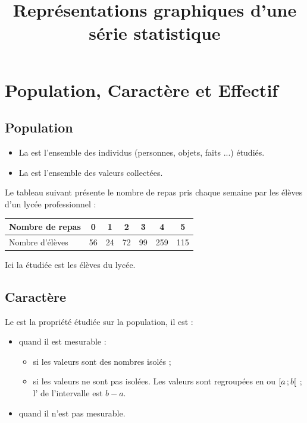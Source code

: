 \documentclass[12pt,a4paper]{article}
\date{}
\title{Représentations graphiques d'une série statistique }
\begin{document}
\maketitle

\section{Population, Caractère et Effectif}

\subsection{Population}
\begin{mydefs}
	\begin{itemize}
		\item La  est l'ensemble des individus (personnes, objets, faits ...) étudiés.
		\item La  est l'ensemble des valeurs collectées.
	\end{itemize}
\end{mydefs}


\begin{myex}
	
	Le tableau suivant présente le nombre de repas pris chaque semaine par les élèves d'un lycée professionnel :
	
	\begin{center}
		\begin{tabular}{|@{\ }l@{\ }|@{\ }c@{\ }|@{\ }c@{\ }|@{\ }c@{\ }|@{\ }c@{\ }|@{\ }c@{\ }|@{\ }c@{\ }|}
			\hline
			Nombre de repas & 0 & 1 & 2 & 3 & 4 & 5 \\ \hline
			Nombre d'élèves & 56 & 24 & 72 & 99 & 259 & 115 \\ \hline
		\end{tabular}
	\end{center}
	
	Ici la  étudiée est les élèves du lycée.
\end{myex}


\subsection{Caractère}

\begin{mydef}

Le  est la propriété étudiée sur la population, il est :
\begin{itemize}
	\item {} quand il est mesurable :
		\begin{itemize}
			\item {} si les valeurs sont des nombres isolés ;
			\item {} si les valeurs ne sont pas isolées. Les valeurs sont regroupées en  ou   $\mbox{\ensuremath{\left[a\mathpunct{};b\right[}}$ ; l' de l'intervalle est $b -a$.
		\end{itemize}
	\item {} quand il n'est pas mesurable. %
\end{itemize}
\end{mydef}
\end{document}
